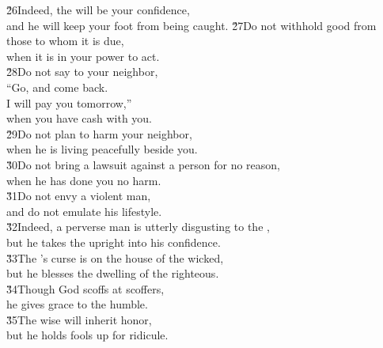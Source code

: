 \begin{poetry}
\poeml \v{26}Indeed, the  will be your confidence, \\
\poemll    and he will keep your foot from being caught.
\poeml \v{27}Do not withhold good from those to whom it is due, \\
\poemll    when it is in your power to act. \\
\poeml \v{28}Do not say to your neighbor, \\
\poemll    ``Go, and come back. \\
\poemlll       I will pay you tomorrow,'' \\
\poeml when you have cash with you. \\
\poeml \v{29}Do not plan to harm your neighbor, \\
\poemll    when he is living peacefully beside you. \\
\poeml \v{30}Do not bring a lawsuit against a person for no reason, \\
\poemll    when he has done you no harm. \\
\poeml \v{31}Do not envy a violent man, \\
\poemll    and do not emulate his lifestyle. \\
\poeml \v{32}Indeed, a perverse man is utterly disgusting to the , \\
\poemll    but he takes the upright into his confidence. \\
\poeml \v{33}The 's curse is on the house of the wicked, \\
\poemll    but he blesses the dwelling of the righteous. \\
\poeml \v{34}Though God scoffs at scoffers, \\
\poemll    he gives grace to the humble. \\
\poeml \v{35}The wise will inherit honor, \\
\poemll    but he holds fools up for ridicule.
\end{poetry}


